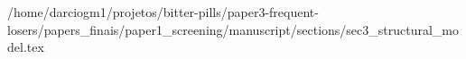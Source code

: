 /home/darciogm1/projetos/bitter-pills/paper3-frequent-losers/papers_finais/paper1_screening/manuscript/sections/sec3_structural_model.tex